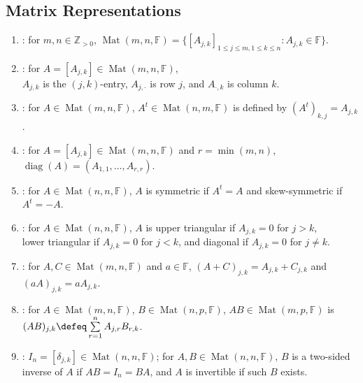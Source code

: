 \subsection{Matrix Representations}
\begin{definition} \label{def:matrices-and-matrix-operations} 
\begin{enumerate}[label=(\roman*)]
\setlength{\itemsep}{0pt}
\item {}: for $m,n\in\mathbb{Z}_{>0}$, $\operatorname{Mat}(m,n,\mathbb{F})=\{[A_{j,k}]_{1\leq j\leq m,1\leq k\leq n}:A_{j,k}\in\mathbb{F}\}$.
\item {}: for $A=[A_{j,k}]\in\operatorname{Mat}(m,n,\mathbb{F})$,\\
$A_{j,k}$ is the $(j,k)$-entry, $A_{j,\cdot}$ is row $j$, and $A_{\cdot,k}$ is column $k$.
\item {}: for $A\in\operatorname{Mat}(m,n,\mathbb{F})$, $A^t\in\operatorname{Mat}(n,m,\mathbb{F})$ is defined by $(A^t)_{k,j}=A_{j,k}$.
\item {}: for $A=[A_{j,k}]\in\operatorname{Mat}(m,n,\mathbb{F})$ and $r=\min(m,n)$, $\operatorname{diag}(A)=(A_{1,1},\ldots,A_{r,r})$.
\item {}: for $A\in\operatorname{Mat}(n,n,\mathbb{F})$, $A$ is symmetric if $A^t=A$ and skew-symmetric if $A^t=-A$.
\item {}: for $A\in\operatorname{Mat}(n,n,\mathbb{F})$, $A$ is upper triangular if $A_{j,k}=0$ for $j>k$,\\
lower triangular if $A_{j,k}=0$ for $j<k$, and diagonal if $A_{j,k}=0$ for $j\neq k$.
\item {}: for $A,C\in\operatorname{Mat}(m,n,\mathbb{F})$ and $a\in\mathbb{F}$, $(A+C)_{j,k}=A_{j,k}+C_{j,k}$ and $(aA)_{j,k}=aA_{j,k}$.
\item {}: for $A\in\operatorname{Mat}(m,n,\mathbb{F})$, $B\in\operatorname{Mat}(n,p,\mathbb{F})$, $AB\in\operatorname{Mat}(m,p,\mathbb{F})$ is $(AB)_{j,k}\defeq\sum\limits_{r=1}^{n}A_{j,r}B_{r,k}$.
\item {}: $I_n=[\delta_{j,k}]\in\operatorname{Mat}(n,n,\mathbb{F})$; for $A,B\in\operatorname{Mat}(n,n,\mathbb{F})$, $B$ is a two-sided inverse of $A$ if $AB=I_n=BA$, and $A$ is invertible if such $B$ exists.
\end{enumerate}
\end{definition}

